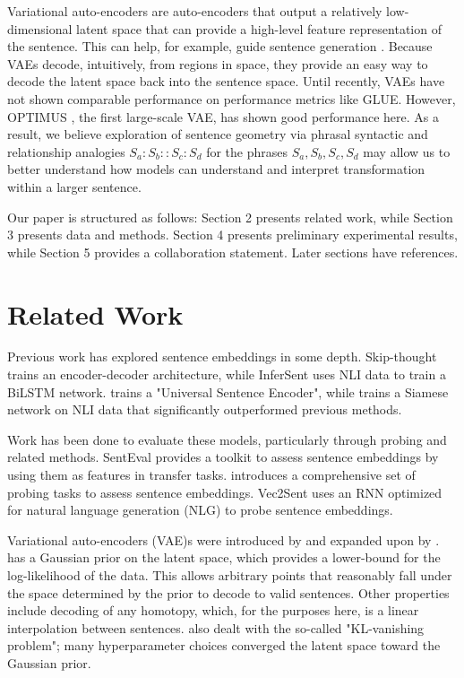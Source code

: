 \documentclass[11pt]{article}
\begin{document}
Variational auto-encoders are auto-encoders that output a relatively low-dimensional latent space that can provide a high-level feature representation of the sentence. This can help, for example, guide sentence generation \cite{li2020_Optimus}. Because VAEs decode, intuitively, from regions in space, they provide an easy way to decode the latent space back into the sentence space. Until recently, VAEs \cite{kingma2014autoencoding, bowman-etal-2016-generating} have not shown comparable performance on performance metrics like GLUE. However, OPTIMUS \cite{li2020_Optimus}, the first large-scale VAE, has shown good performance here. As a result, we believe exploration of sentence geometry via phrasal syntactic and relationship analogies \(S_a:S_b::S_c:S_d\) for the phrases \(S_a, S_b, S_c, S_d\) may allow us to better understand how models can understand and interpret  transformation within a larger sentence. 

Our paper is structured as follows:  Section 2 presents related work, while Section 3 presents data and methods. Section 4 presents preliminary experimental results, while Section 5 provides a collaboration statement. Later sections have references.  


\section{Related Work}

Previous work has explored sentence embeddings in some depth. Skip-thought \cite{kiros2015skipthought} trains an encoder-decoder architecture, while InferSent \cite{conneau2018supervised} uses NLI data to train a BiLSTM network. \citet{cer2018universal} trains a "Universal Sentence Encoder", while \citet{reimers2019sentencebert} trains a Siamese network on NLI data that significantly outperformed previous methods. 

Work has been done to evaluate these models, particularly through probing and related methods. SentEval \cite{conneau2018supervised} provides a toolkit to assess sentence embeddings by using them as features in transfer tasks. \citet{conneau2018cram} introduces a comprehensive set of probing tasks to assess sentence embeddings. Vec2Sent \cite{kerscher2020vec2sent} uses an RNN optimized for natural language generation (NLG) to probe sentence embeddings. 


Variational auto-encoders (VAE)s were introduced by \cite{kingma2014autoencoding, rezende14} and expanded upon by \cite{bowman-etal-2016-generating}. \citet{bowman-etal-2016-generating} has a Gaussian prior on the latent space, which provides a lower-bound for the log-likelihood of the data. This allows arbitrary points that reasonably fall under the space determined by the prior to decode to valid sentences. Other properties include decoding of any homotopy, which, for the purposes here, is a linear interpolation between sentences. \citet{bowman-etal-2016-generating} also dealt with the so-called "KL-vanishing problem"; many hyperparameter choices converged the latent space toward the Gaussian prior. 
\end{document}
